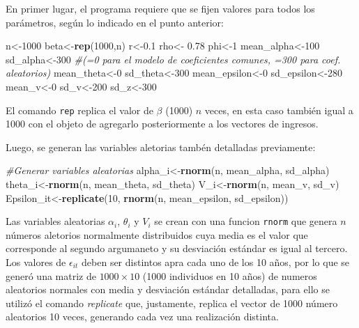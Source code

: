 \documentclass[]{article}
\newenvironment{Shaded}{\begin{snugshade}}{\end{snugshade}}
\newcommand{\KeywordTok}[1]{\textcolor[rgb]{0.13,0.29,0.53}{\textbf{{#1}}}}
\newcommand{\DecValTok}[1]{\textcolor[rgb]{0.00,0.00,0.81}{{#1}}}
\newcommand{\FloatTok}[1]{\textcolor[rgb]{0.00,0.00,0.81}{{#1}}}
\newcommand{\StringTok}[1]{\textcolor[rgb]{0.31,0.60,0.02}{{#1}}}
\newcommand{\CommentTok}[1]{\textcolor[rgb]{0.56,0.35,0.01}{\textit{{#1}}}}
\newcommand{\NormalTok}[1]{{#1}}
\begin{document}
En primer lugar, el programa requiere que se fijen valores para todos
los parámetros, según lo indicado en el punto anterior:

\begin{Shaded}
\begin{Highlighting}[]
\NormalTok{n<-}\DecValTok{1000}
\NormalTok{beta<-}\KeywordTok{rep}\NormalTok{(}\DecValTok{1000}\NormalTok{,n)}
\NormalTok{r<-}\FloatTok{0.1}
\NormalTok{rho<-}\StringTok{ }\FloatTok{0.78}
\NormalTok{phi<-}\DecValTok{1}
\NormalTok{mean_alpha<-}\DecValTok{100}
\NormalTok{sd_alpha<-}\DecValTok{300} \CommentTok{#(=0 para el modelo de coeficientes comunes, =300 para coef. aleatorios)}
\NormalTok{mean_theta<-}\DecValTok{0}
\NormalTok{sd_theta<-}\DecValTok{300}
\NormalTok{mean_epsilon<-}\DecValTok{0}
\NormalTok{sd_epsilon<-}\DecValTok{280}
\NormalTok{mean_v<-}\DecValTok{0}
\NormalTok{sd_v<-}\DecValTok{200}
\NormalTok{sd_z<-}\DecValTok{300}
\end{Highlighting}
\end{Shaded}

El comando \texttt{rep} replica el valor de $\beta$ (1000) $n$ veces, en
esta caso también igual a 1000 con el objeto de agregarlo posteriormente
a los vectores de ingresos.

Luego, se generan las variables aletorias tambén detalladas previamente:

\begin{Shaded}
\begin{Highlighting}[]
\CommentTok{#Generar variables aleatorias}
\NormalTok{alpha_i<-}\KeywordTok{rnorm}\NormalTok{(n, mean_alpha, sd_alpha)}
\NormalTok{theta_i<-}\KeywordTok{rnorm}\NormalTok{(n, mean_theta, sd_theta)}
\NormalTok{V_i<-}\KeywordTok{rnorm}\NormalTok{(n, mean_v, sd_v)}
\NormalTok{Epsilon_it<-}\KeywordTok{replicate}\NormalTok{(}\DecValTok{10}\NormalTok{, }\KeywordTok{rnorm}\NormalTok{(n, mean_epsilon, sd_epsilon)) }
\end{Highlighting}
\end{Shaded}

Las variables aleatorias $\alpha_{i}$, $\theta_{i}$ y $V_{i}$ se crean
con una funcion \texttt{rnorm} que genera $n$ números aletorios
normalmente distribuidos cuya media es el valor que corresponde al
segundo argumaneto y su desviación estándar es igual al tercero. Los
valores de $\epsilon_{it}$ deben ser distintos apra cada uno de los 10
años, por lo que se generó una matriz de $1000\times 10$ (1000
individuos en 10 años) de numeros aleatorios normales con media y
desviación estándar detalladas, para ello se utilizó el comando
\emph{replicate} que, justamente, replica el vector de 1000 número
aleatorios 10 veces, generando cada vez una realización distinta.
\end{document}
